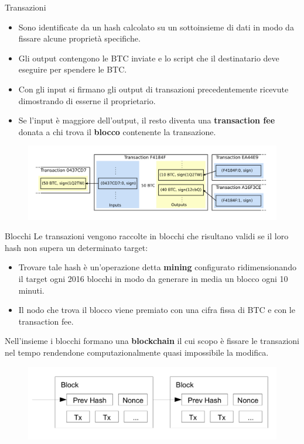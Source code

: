 \documentclass[italian]{beamer}
\begin{document}
\begin{frame}{Transazioni} %
\begin{itemize}
 \item Sono identificate da un hash calcolato su un sottoinsieme di dati in modo da fissare alcune proprietà specifiche.
 \item Gli output contengono le BTC inviate e lo script che il destinatario deve eseguire per spendere le BTC.
 \item Con gli input si firmano gli output di transazioni precedentemente ricevute dimostrando di esserne il proprietario.
 \item Se l'input è maggiore dell'output, il resto diventa una \textbf{transaction fee} donata a chi trova il \textbf{blocco} contenente la transazione.
\end{itemize}
\begin{figure}[htbp]
\centering
\includegraphics[width=\textwidth]{bitcoinpropagation_1.PNG}
\end{figure}
\end{frame}

\begin{frame}{Blocchi} %
Le transazioni vengono raccolte in blocchi che risultano validi se il loro hash non supera un determinato target:
\begin{itemize}
 \item Trovare tale hash è un'operazione detta \textbf{mining} configurato ridimensionando il target ogni 2016 blocchi in modo da generare in media un blocco ogni 10 minuti.
 \item Il nodo che trova il blocco viene premiato con una cifra fissa di BTC e con le transaction fee.
\end{itemize}
Nell'insieme i blocchi formano una \textbf{blockchain} il cui scopo è fissare le transazioni nel tempo rendendone computazionalmente quasi impossibile la modifica.
\begin{figure}[htbp]
\centering
\includegraphics[width=\textwidth]{bitcoin_p3_1.PNG}
\end{figure}
\end{frame}
\end{document}
